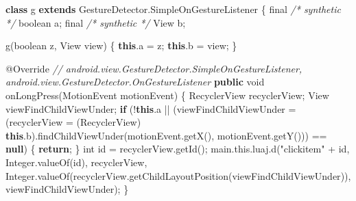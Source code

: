 \documentclass[
]{article}
\newenvironment{Shaded}{}{}
\newcommand{\AttributeTok}[1]{\textcolor[rgb]{0.49,0.56,0.16}{#1}}
\newcommand{\BuiltInTok}[1]{\textcolor[rgb]{0.00,0.50,0.00}{#1}}
\newcommand{\CommentTok}[1]{\textcolor[rgb]{0.38,0.63,0.69}{\textit{#1}}}
\newcommand{\ControlFlowTok}[1]{\textcolor[rgb]{0.00,0.44,0.13}{\textbf{#1}}}
\newcommand{\DataTypeTok}[1]{\textcolor[rgb]{0.56,0.13,0.00}{#1}}
\newcommand{\FunctionTok}[1]{\textcolor[rgb]{0.02,0.16,0.49}{#1}}
\newcommand{\KeywordTok}[1]{\textcolor[rgb]{0.00,0.44,0.13}{\textbf{#1}}}
\newcommand{\NormalTok}[1]{#1}
\newcommand{\OperatorTok}[1]{\textcolor[rgb]{0.40,0.40,0.40}{#1}}
\newcommand{\StringTok}[1]{\textcolor[rgb]{0.25,0.44,0.63}{#1}}
\begin{document}
\begin{Shaded}
\begin{Highlighting}[]
    \KeywordTok{class}\NormalTok{ g }\KeywordTok{extends}\NormalTok{ GestureDetector}\OperatorTok{.}\FunctionTok{SimpleOnGestureListener} \OperatorTok{\{}
        \DataTypeTok{final} \CommentTok{/* synthetic */} \DataTypeTok{boolean}\NormalTok{ a}\OperatorTok{;}
        \DataTypeTok{final} \CommentTok{/* synthetic */} \BuiltInTok{View}\NormalTok{ b}\OperatorTok{;}

        \FunctionTok{g}\OperatorTok{(}\DataTypeTok{boolean}\NormalTok{ z}\OperatorTok{,} \BuiltInTok{View}\NormalTok{ view}\OperatorTok{)} \OperatorTok{\{}
            \KeywordTok{this}\OperatorTok{.}\FunctionTok{a} \OperatorTok{=}\NormalTok{ z}\OperatorTok{;}
            \KeywordTok{this}\OperatorTok{.}\FunctionTok{b} \OperatorTok{=}\NormalTok{ view}\OperatorTok{;}
        \OperatorTok{\}}

        \AttributeTok{@Override} \CommentTok{// android.view.GestureDetector.SimpleOnGestureListener, android.view.GestureDetector.OnGestureListener}
        \KeywordTok{public} \DataTypeTok{void} \FunctionTok{onLongPress}\OperatorTok{(}\NormalTok{MotionEvent motionEvent}\OperatorTok{)} \OperatorTok{\{}
\NormalTok{            RecyclerView recyclerView}\OperatorTok{;}
            \BuiltInTok{View}\NormalTok{ viewFindChildViewUnder}\OperatorTok{;}
            \ControlFlowTok{if} \OperatorTok{(!}\KeywordTok{this}\OperatorTok{.}\FunctionTok{a} \OperatorTok{||} \OperatorTok{(}\NormalTok{viewFindChildViewUnder }\OperatorTok{=} \OperatorTok{(}\NormalTok{recyclerView }\OperatorTok{=} \OperatorTok{(}\NormalTok{RecyclerView}\OperatorTok{)} \KeywordTok{this}\OperatorTok{.}\FunctionTok{b}\OperatorTok{).}\FunctionTok{findChildViewUnder}\OperatorTok{(}\NormalTok{motionEvent}\OperatorTok{.}\FunctionTok{getX}\OperatorTok{(),}\NormalTok{ motionEvent}\OperatorTok{.}\FunctionTok{getY}\OperatorTok{()))} \OperatorTok{==} \KeywordTok{null}\OperatorTok{)} \OperatorTok{\{}
                \ControlFlowTok{return}\OperatorTok{;}
            \OperatorTok{\}}
            \DataTypeTok{int}\NormalTok{ id }\OperatorTok{=}\NormalTok{ recyclerView}\OperatorTok{.}\FunctionTok{getId}\OperatorTok{();}
\NormalTok{            main}\OperatorTok{.}\FunctionTok{this}\OperatorTok{.}\FunctionTok{luaj}\OperatorTok{.}\FunctionTok{d}\OperatorTok{(}\StringTok{"clickitem"} \OperatorTok{+}\NormalTok{ id}\OperatorTok{,} \BuiltInTok{Integer}\OperatorTok{.}\FunctionTok{valueOf}\OperatorTok{(}\NormalTok{id}\OperatorTok{),}\NormalTok{ recyclerView}\OperatorTok{,} \BuiltInTok{Integer}\OperatorTok{.}\FunctionTok{valueOf}\OperatorTok{(}\NormalTok{recyclerView}\OperatorTok{.}\FunctionTok{getChildLayoutPosition}\OperatorTok{(}\NormalTok{viewFindChildViewUnder}\OperatorTok{)),}\NormalTok{ viewFindChildViewUnder}\OperatorTok{);}
        \OperatorTok{\}}


\end{Highlighting}
\end{Shaded}
\end{document}
